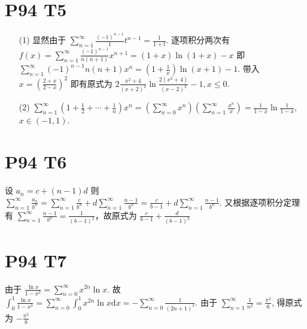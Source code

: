 \documentclass{article}
\newcommand{\nti}{\sum_{n = 1}^{\infty}}
\begin{document}
\section*{P94 T5}

\begin{itemize}
    \item [(1)] 显然由于 $\nti \frac{(-1)^{n - 1}}{1}t^{n - 1} = \frac{1}{1 + t}$. 逐项积分两次有 $f(x) = \nti \frac{(-1)^{n - 1}}{n(n + 1)}x^{n + 1} = (1 + x)\ln (1 + x) - x$ 即 $\nti {(-1)^{n - 1}}{n(n + 1)}x^{n} = \left(1 + \frac{1}{x}\right)\ln(x + 1) - 1$. 带入 $x = \left(\frac{2 + x}{2 - x}\right)^2$ 即有原式为 $2\frac{x^2 + 4}{(x + 2)^2}\ln \frac{2(x^2 + 4)}{(x - 2)^2} - 1, x \leq 0$.
    \item [(2)] $\nti\left(1 + \frac{1}{2} + \cdots + \frac{1}{n}\right)x^n = \left(\sum_{n = 0}^{\infty}x^n\right)\left(\nti \frac{x^n}{x}\right) = \frac{1}{1 - x}\ln \frac{1}{1 - x}$, $x \in (-1, 1)$.
\end{itemize}

\section*{P94 T6}

设 $a_n = c + (n - 1)d$ 则 $\nti \frac{a_n}{b^n} = \nti \frac{c}{b^n} + d\nti \frac{n - 1}{b^n} = \frac{c}{b - 1} + d\nti \frac{n - 1}{b^n}$. 又根据逐项积分定理有 $\nti \frac{n - 1}{b^n} = \frac{1}{(b - 1)^2}$，故原式为 $\frac{c}{b - 1} + \frac{d}{(b - 1)^2}$

\section*{P94 T7}

由于 $\frac{\ln x}{1 - x^2} = \sum_{n = 0}^{\infty}x^{2n} \ln x$. 故 $\int_{0}^{1}\frac{\ln x}{1 - x^2} = \sum_{n = 0}^{\infty}\int_{0}^{1}x^{2n} \ln x \mathrm{d}x = - \sum_{n = 0}^{\infty}\frac{1}{(2n + 1)^2}$. 由于 $\nti \frac{1}{n^2} = \frac{\pi^2}{6}$, 得原式为 $-\frac{\pi^2}{8}$
\end{document}
